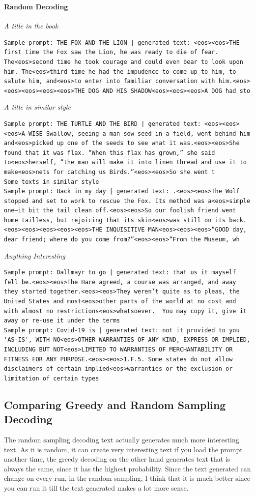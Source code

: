 \documentclass{article}
\begin{document}
\textbf{Random Decoding}\\\\
\emph{A title in the book}
\begin{lstlisting}
Sample prompt: THE FOX AND THE LION | generated text: <eos><eos>THE first time the Fox saw the Lion, he was ready to die of fear. The<eos>second time he took courage and could even bear to look upon him. The<eos>third time he had the impudence to come up to him, to salute him, and<eos>to enter into familiar conversation with him.<eos><eos><eos><eos><eos>THE DOG AND HIS SHADOW<eos><eos><eos>A DOG had sto
\end{lstlisting}
\emph{A title in similar style}
\begin{lstlisting}
Sample prompt: THE TURTLE AND THE BIRD | generated text: <eos><eos><eos>A WISE Swallow, seeing a man sow seed in a field, went behind him and<eos>picked up one of the seeds to see what it was.<eos><eos>She found that it was flax. “When this flax has grown,” she said to<eos>herself, “the man will make it into linen thread and use it to make<eos>nets for catching us Birds.”<eos><eos>So she went t
Some texts in similar style
Sample prompt: Back in my day | generated text: .<eos><eos>The Wolf stopped and set to work to rescue the Fox. Its method was a<eos>simple one—it bit the tail clean off.<eos><eos>So our foolish friend went home tailless, but rejoicing that its skin<eos>was still on its back.<eos><eos><eos><eos><eos>THE INQUISITIVE MAN<eos><eos><eos>“GOOD day, dear friend; where do you come from?”<eos><eos>“From the Museum, wh
\end{lstlisting}
\emph{Anything Interesting}
\begin{lstlisting}
Sample prompt: Dallmayr to go | generated text: that us it mayself fell be.<eos><eos>The Hare agreed, a course was arranged, and away they started together.<eos><eos>They weren’t quite as to pleas, the United States and most<eos>other parts of the world at no cost and with almost no restrictions<eos>whatsoever.  You may copy it, give it away or re-use it under the terms
Sample prompt: Covid-19 is | generated text: not it provided to you 'AS-IS', WITH NO<eos>OTHER WARRANTIES OF ANY KIND, EXPRESS OR IMPLIED, INCLUDING BUT NOT<eos>LIMITED TO WARRANTIES OF MERCHANTABILITY OR FITNESS FOR ANY PURPOSE.<eos><eos>1.F.5. Some states do not allow disclaimers of certain implied<eos>warranties or the exclusion or limitation of certain types
\end{lstlisting}
\clearpage
\subsection{Comparing Greedy and Random Sampling Decoding}
The random sampling decoding text actually generates much more interesting text. As it is random, it can create very interesting text if you load the prompt another time, the greedy decoding on the other hand generates text that is always the same, since it has the highest probability. Since the text generated can change on every run, in the random sampling, I think that it is much better since you can run it till the text generated makes a lot more sense.
\end{document}
